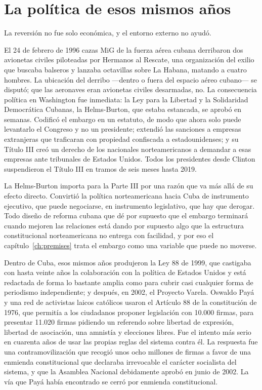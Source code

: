 \section{La política de esos mismos años}

La reversión no fue solo económica, y el entorno externo no ayudó.

El 24 de febrero de 1996 cazas MiG de la fuerza aérea cubana derribaron dos
avionetas civiles piloteadas por Hermanos al Rescate, una organización del exilio
que buscaba balseros y lanzaba octavillas sobre La Habana, matando a cuatro
hombres. La ubicación del derribo ---dentro o fuera del espacio aéreo cubano--- se
disputó; que las aeronaves eran avionetas civiles desarmadas, no. La consecuencia
política en Washington fue inmediata: la Ley para la Libertad y la Solidaridad
Democrática Cubanas, la Helms-Burton, que estaba estancada, se aprobó en semanas.
Codificó el embargo en un estatuto, de modo que ahora solo puede levantarlo el
Congreso y no un presidente; extendió las sanciones a empresas extranjeras que
traficaran con propiedad confiscada a estadounidenses; y su Título III creó un
derecho de los nacionales norteamericanos a demandar a esas empresas ante
tribunales de Estados Unidos. Todos los presidentes desde Clinton suspendieron el
Título III en tramos de seis meses hasta 2019.

La Helms-Burton importa para la Parte III por una razón que va más allá de su
efecto directo. Convirtió la política norteamericana hacia Cuba de instrumento
ejecutivo, que puede negociarse, en instrumento legislativo, que hay que derogar.
Todo diseño de reforma cubana que dé por supuesto que el embargo terminará cuando
mejoren las relaciones está dando por supuesto algo que la estructura
constitucional norteamericana no entrega con facilidad, y por eso el
capítulo~\ref{ch:premises} trata el embargo como una variable que puede no
moverse.

Dentro de Cuba, esos mismos años produjeron la Ley 88 de 1999, que castigaba con
hasta veinte años la colaboración con la política de Estados Unidos y está
redactada de forma lo bastante amplia como para cubrir casi cualquier forma de
periodismo independiente; y después, en 2002, el Proyecto Varela. Oswaldo Payá y
una red de activistas laicos católicos usaron el Artículo 88 de la constitución de
1976, que permitía a los ciudadanos proponer legislación con 10.000 firmas, para
presentar 11.020 firmas pidiendo un referendo sobre libertad de expresión,
libertad de asociación, una amnistía y elecciones libres. Fue el intento más serio
en cuarenta años de usar las propias reglas del sistema contra él. La respuesta
fue una contramovilización que recogió unos ocho millones de firmas a favor de una
enmienda constitucional que declaraba irrevocable el carácter socialista del
sistema, y que la Asamblea Nacional debidamente aprobó en junio de 2002. La vía
que Payá había encontrado se cerró por enmienda constitucional.

